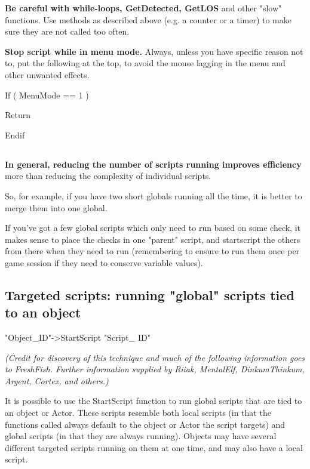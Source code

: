 \textbf{Be careful with while-loops, GetDetected, GetLOS} and other
"slow" functions. Use methods as described above (e.g. a counter or a
timer) to make sure they are not called too often.

\textbf{Stop script while in menu mode.} Always, unless you have
specific reason not to, put the following at the top, to avoid the mouse
lagging in the menu and other unwanted effects.

If ( MenuMode == 1 )

Return

Endif

\hypertarget{section-12}{%
\subsection{}\label{section-12}}

\textbf{In general, reducing the number of scripts running improves
efficiency} more than reducing the complexity of individual scripts.

So, for example, if you have two short globals running all the time, it
is better to merge them into one global.

If you've got a few global scripts which only need to run based on some
check, it makes sense to place the checks in one "parent" script, and
startscript the others from there when they need to run (remembering to
ensure to run them once per game session if they need to conserve
variable values).

\hypertarget{targeted-scripts-running-global-scripts-tied-to-an-object}{%
\subsection{\texorpdfstring{\hfill\break
Targeted scripts: running "global" scripts tied to an
object}{ Targeted scripts: running "global" scripts tied to an object}}\label{targeted-scripts-running-global-scripts-tied-to-an-object}}

"Object\_ID"-\textgreater StartScript "Script\_ ID"

\emph{(Credit for discovery of this technique and much of the following
information goes to FreshFish. Further information supplied by Riiak,
MentalElf, DinkumThinkum, Argent, Cortex, and others.)}

It is possible to use the StartScript function to run global scripts
that are tied to an object or Actor. These scripts resemble both local
scripts (in that the functions called always default to the object or
Actor the script targets) and global scripts (in that they are always
running). Objects may have several different targeted scripts running on
them at one time, and may also have a local script.

